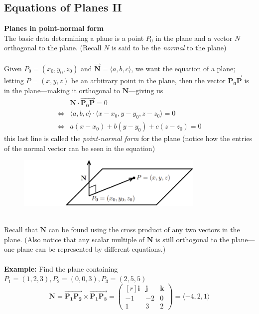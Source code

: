 \documentclass{report}
\begin{document}
\subsection{Equations of Planes II} %
\textbf{Planes in point-normal form}\\
The basic data determining a plane is a point $P_0$ in the plane and a vector
$N$ orthogonal to the plane. (Recall $N$ is said to be the \textit{normal} to the plane)\\
\vspace{1mm}\\
Given $P_0=(x_0,y_0,z_0)$ and $\overrightarrow{\mathbf{N}}=\langle a,b,c\rangle$, 
we want the equation of a plane; letting $P=(x,y,z)$ be an arbitrary point in the plane,
then the vector $\overrightarrow{\mathbf{P_0P}}$ is in the plane---making it 
orthogonal to $\mathbf{N}$---giving us
\begin{align*}
&\mathbf{N}\cdot\overrightarrow{\mathbf{P_0P}}=0\\
\iff&\langle a,b,c\rangle\cdot\langle x-x_0,y-y_0,z-z_0\rangle=0\\
\iff&a(x-x_0)+b(y-y_0)+c(z-z_0)=0
\end{align*}
this last line is called the \textit{point-normal form} for the plane
(notice how the entries of the normal vector can be seen in the equation)
\begin{figure}[h]
\includegraphics[width=9cm]{Capture81}\\
\centering
\end{figure}\\
Recall that $\mathbf{N}$ can be found using the cross product of any two vectors in the plane.
(Also notice that any scalar multiple of $\mathbf{N}$ is still orthogonal to the plane---
one plane can be represented by different equations.)\\
\vspace{1mm}\\
\textbf{Example: }Find the plane containing $P_1=(1,2,3),P_2=(0,0,3),P_3=(2,5,5)$
\begin{equation*}
\mathbf{N}=\overrightarrow{\mathbf{P_1P_2}}\times\overrightarrow{\mathbf{P_1P_3}}=
\begin{pmatrix*}[r]
\mathbf{i}&\mathbf{j}&\mathbf{k}\\
-1&-2&0\\
1&3&2
\end{pmatrix*}
=\langle-4,2,1\rangle
\end{equation*}
\end{document}

